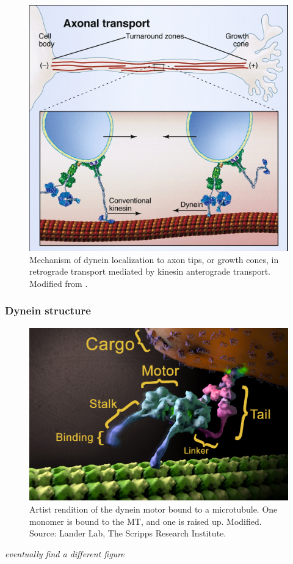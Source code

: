\documentclass[10pt]{article} %
\begin{document}
\begin{figure}[h]
  \centering
  \includegraphics[width=.65\textwidth,keepaspectratio]{../../figures/retrograde_transport.jpg}
  \caption{Mechanism of dynein localization to axon tips, or growth cones, in retrograde transport mediated by kinesin anterograde transport. Modified from \cite{valetoolbox}.}
  \label{retrograde-transport}
\end{figure}

\subsubsection{Dynein structure}

\begin{figure}[h]
  \centering
  \includegraphics[width=.65\textwidth,keepaspectratio]{../../figures/dynein-artist-rendition.jpg}
  \caption{Artist rendition of the dynein motor bound to a microtubule. One monomer is bound to the MT, and one is raised up. Modified. Source: Lander Lab, The Scripps Research Institute.}
  \label{dynein-artist-rendition-2}
\end{figure}

\textit{eventually find a different figure}
\end{document}
